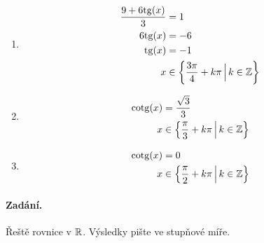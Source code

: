 \documentclass[11pt,a4paper]{article}
\begin{document}
\begin{enumerate}
				\item 
				\begin{align*}
					\frac{9 + 6\mathrm{tg}(x)}{3} &= 1
				\\
					6\mathrm{tg}(x) &= -6
				\\
					\mathrm{tg}(x) &= -1
				\\
					x &\in \left\{ \frac{3\pi}{4} + k\pi \, \Big| \, k \in {\mathbb Z} \right\}
				\end{align*}
				
				\item 
				\begin{align*}
					\mathrm{cotg}(x) &= \frac{\sqrt 3}{3}
				\\
					x &\in \left\{ \frac \pi 3 + k\pi \, \Big| \, k \in {\mathbb Z} \right\}
				\end{align*}
				
				\item 
				\begin{align*}
					\mathrm{cotg}(x) &= 0
				\\
					x &\in \left\{ \frac \pi 2 + k\pi \, \Big| \, k \in {\mathbb Z} \right\}
				\end{align*}
				
			\end{enumerate}
\newpage
		\paragraph*{Zadání.} Řeště rovnice v ${\mathbb R}$. Výsledky pište ve stupňové míře.
			
\end{document}
